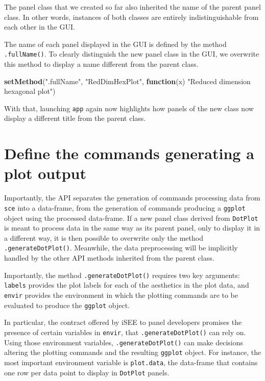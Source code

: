 \documentclass[]{book}
\newenvironment{Shaded}{\begin{snugshade}}{\end{snugshade}}
\newcommand{\KeywordTok}[1]{\textcolor[rgb]{0.13,0.29,0.53}{\textbf{#1}}}
\newcommand{\StringTok}[1]{\textcolor[rgb]{0.31,0.60,0.02}{#1}}
\newcommand{\ControlFlowTok}[1]{\textcolor[rgb]{0.13,0.29,0.53}{\textbf{#1}}}
\newcommand{\NormalTok}[1]{#1}
\begin{document}
The panel class that we created so far also inherited the name of the
parent panel class. In other words, instances of both classes are
entirely indistinguishable from each other in the GUI.

The name of each panel displayed in the GUI is defined by the method
\texttt{.fullName()}. To clearly distinguish the new panel class in the
GUI, we overwrite this method to display a name different from the
parent class.

\begin{Shaded}
\begin{Highlighting}[]
\KeywordTok{setMethod}\NormalTok{(}\StringTok{".fullName"}\NormalTok{, }\StringTok{"RedDimHexPlot"}\NormalTok{, }\ControlFlowTok{function}\NormalTok{(x) }\StringTok{"Reduced dimension hexagonal plot"}\NormalTok{)}
\end{Highlighting}
\end{Shaded}

With that, launching \texttt{app} again now highlights how panels of the
new class now display a different title from the parent class.

\section{Define the commands generating a plot
output}\label{define-the-commands-generating-a-plot-output}

Importantly, the API separates the generation of commands processing
data from \texttt{sce} into a data-frame, from the generation of
commands producing a \texttt{ggplot} object using the processed
data-frame. If a new panel class derived from \texttt{DotPlot} is meant
to process data in the same way as its parent panel, only to display it
in a different way, it is then possible to overwrite only the method
\texttt{.generateDotPlot()}. Meanwhile, the data preprocessing will be
implicitly handled by the other API methods inherited from the parent
class.

Importantly, the method \texttt{.generateDotPlot()} requires two key
arguments: \texttt{labels} provides the plot labels for each of the
aesthetics in the plot data, and \texttt{envir} provides the environment
in which the plotting commands are to be evaluated to produce the
\texttt{ggplot} object.

In particular, the contract offered by iSEE to panel developers promises
the presence of certain variables in \texttt{envir}, that
\texttt{.generateDotPlot()} can rely on. Using those environment
variables, \texttt{.generateDotPlot()} can make decisions altering the
plotting commands and the resulting \texttt{ggplot} object. For
instance, the most important environment variable is \texttt{plot.data},
the data-frame that contains one row per data point to display in
\texttt{DotPlot} panels.
\end{document}
